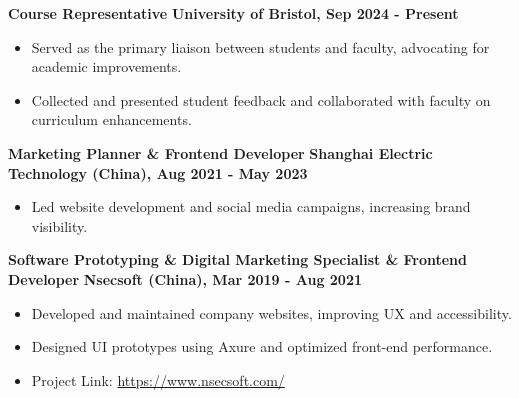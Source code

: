 \documentclass[10pt,a4paper]{article} %
\begin{document}
\textbf{Course Representative} \hfill \textbf{University of Bristol, Sep 2024 - Present} \\
\begin{itemize}
    \item Served as the primary liaison between students and faculty, advocating for academic improvements.
    \item Collected and presented student feedback and collaborated with faculty on curriculum enhancements.
\end{itemize}

\textbf{Marketing Planner \& Frontend Developer} \hfill \textbf{Shanghai Electric Technology (China), Aug 2021 - May 2023} \\
\begin{itemize}
    \item Led website development and social media campaigns, increasing brand visibility.
\end{itemize}

\textbf{Software Prototyping \& Digital Marketing Specialist \& Frontend Developer} \hfill \textbf{Nsecsoft (China), Mar 2019 - Aug 2021} \\
\begin{itemize}
    \item Developed and maintained company websites, improving UX and accessibility.
    \item Designed UI prototypes using Axure and optimized front-end performance.
    \item Project Link: \href{https://www.nsecsoft.com/}{https://www.nsecsoft.com/}
\end{itemize}
\end{document}
